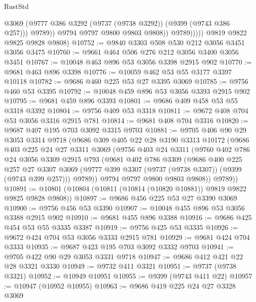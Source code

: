 \begin{lexlean}{RustStd}
\begin{coremodule}
                        @3069
                        (@9777 @386 @3292 (@9737 (@9738 @3292)) (@9399 (@9743 @386 @257)))
                        @9789))
                    @9794
                    @9797
                    @9800
                    @9803
                    @9808))
                @9789)))))
      @9819
      @9822
      @9825
      @9828
      @9808)
@10752 := @9840 @3303 @508 @530 @212 @3056 @3451 @3056 @3475
@10760 := @9661 @464 @506 @276 @212 @3056 @3400 @3056 @3451
@10767 := @10048 @463 @896 @53 @3056 @3398 @2915 @902
@10770 := @9681 @463 @896 @3398
@10776 := @10059 @462 @53 @55 @3177 @3397 @10118
@10782 := @9686 @460 @225 @53 @27 @3395 @3069
@10785 := @9756 @460 @53 @3395
@10792 := @10048 @459 @896 @53 @3056 @3393 @2915 @902
@10795 := @9681 @459 @896 @3393
@10801 := @9686 @409 @458 @53 @55 @3318 @3392
@10804 := @9756 @409 @53 @3318
@10811 := @9672 @408 @704 @53 @3056 @3316 @2915 @781
@10814 := @9681 @408 @704 @3316
@10820 := @9687 @407 @195 @703 @3092 @3315 @9703
@10881 := @9705
    @406
    @90
    @29
    @3053
    @3314
    @9718
    (@9686
      @309
      @405
      @22
      @28
      @3190
      @3313
      @10172
      (@9686
        @403
        @225
        @24
        @27
        @3311
        @3069
        (@9756
          @403
          @24
          @3311
          (@9760
            @402
            @786
            @24
            @3056
            @3309
            @2915
            @793
            (@9681
              @402
              @786
              @3309
              (@9686
                @400
                @225
                @257
                @27
                @3307
                @3069
                (@9777 @399 @3307 (@9737 (@9738 @3307)) (@9399 (@9743 @399 @257)))
                @9789))
            @9794
            @9797
            @9800
            @9803
            @9808))
        @9789))
@10891 := @10801 (@10804 (@10811 (@10814 (@10820 @10881)) @9819 @9822 @9825 @9828 @9808))
@10897 := @9686 @456 @225 @53 @27 @3390 @3069
@10900 := @9756 @456 @53 @3390
@10907 := @10048 @455 @896 @53 @3056 @3388 @2915 @902
@10910 := @9681 @455 @896 @3388
@10916 := @9686 @425 @454 @53 @55 @3335 @3387
@10919 := @9756 @425 @53 @3335
@10926 := @9672 @424 @704 @53 @3056 @3333 @2915 @781
@10929 := @9681 @424 @704 @3333
@10935 := @9687 @423 @195 @703 @3092 @3332 @9703
@10941 := @9705 @422 @90 @29 @3053 @3331 @9718
@10947 := @9686 @412 @421 @22 @28 @3321 @3330
@10949 := @9732 @411 @3321
@10951 := @9737 (@9738 @3321)
@10952 := @10949 @10951
@10955 := @9399 (@9743 @411 @22)
@10957 := @10947 (@10952 @10955)
@10963 := @9686 @419 @225 @24 @27 @3328 @3069

\end{coremodule}
\end{lexlean}
